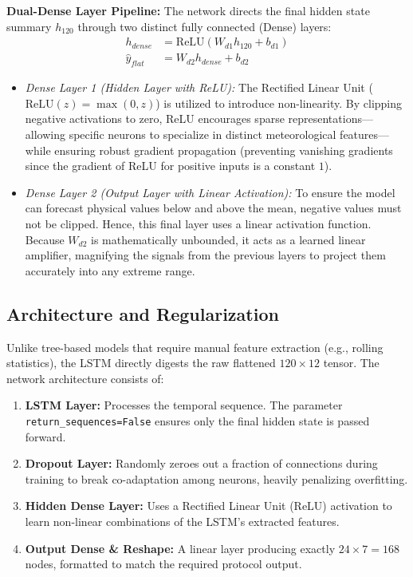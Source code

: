 \documentclass[12pt,a4paper,oneside]{report}
\begin{document}
    \textbf{Dual-Dense Layer Pipeline:} The network directs the final hidden state summary $h_{120}$ through two distinct fully connected (Dense) layers:
    \begin{align}
    h_{dense} &= \text{ReLU}(W_{d1} h_{120} + b_{d1}) \label{eq:dense_1} \\
    \hat{y}_{flat} &= W_{d2} h_{dense} + b_{d2} \label{eq:dense_2}
    \end{align}
    \begin{itemize}
        \item \textit{Dense Layer 1 (Hidden Layer with ReLU):} The Rectified Linear Unit ($\text{ReLU}(z) = \max(0, z)$) is utilized to introduce non-linearity. By clipping negative activations to zero, ReLU encourages sparse representations—allowing specific neurons to specialize in distinct meteorological features—while ensuring robust gradient propagation (preventing vanishing gradients since the gradient of ReLU for positive inputs is a constant $1$).
        \item \textit{Dense Layer 2 (Output Layer with Linear Activation):} To ensure the model can forecast physical values below and above the mean, negative values must not be clipped. Hence, this final layer uses a linear activation function. Because $W_{d2}$ is mathematically unbounded, it acts as a learned linear amplifier, magnifying the signals from the previous layers to project them accurately into any extreme range.
    \end{itemize}

\subsection{Architecture and Regularization}
Unlike tree-based models that require manual feature extraction (e.g., rolling statistics), the LSTM directly digests the raw flattened $120 \times 12$ tensor. The network architecture consists of:
\begin{enumerate}
    \item \textbf{LSTM Layer:} Processes the temporal sequence. The parameter \texttt{return\_sequences=False} ensures only the final hidden state is passed forward.
    \item \textbf{Dropout Layer:} Randomly zeroes out a fraction of connections during training to break co-adaptation among neurons, heavily penalizing overfitting.
    \item \textbf{Hidden Dense Layer:} Uses a Rectified Linear Unit (ReLU) activation to learn non-linear combinations of the LSTM's extracted features.
    \item \textbf{Output Dense \& Reshape:} A linear layer producing exactly $24 \times 7 = 168$ nodes, formatted to match the required protocol output.
\end{enumerate}
\end{document}
